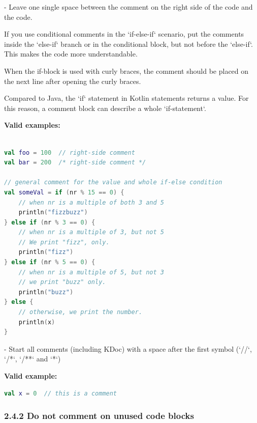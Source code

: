 - Leave one single space between the comment on the right side of the code and the code. 

If you use conditional comments in the `if-else-if` scenario, put the comments inside the `else-if` branch or in the conditional block, but not before the `else-if`. This makes the code more understandable.

When the if-block is used with curly braces, the comment should be placed on the next line after opening the curly braces.

Compared to Java, the `if` statement in Kotlin statements returns a value. For this reason, a comment block can describe a whole `if-statement`.



\textbf{Valid examples:}



\begin{lstlisting}[language=Kotlin]

val foo = 100  // right-side comment
val bar = 200  /* right-side comment */

// general comment for the value and whole if-else condition
val someVal = if (nr % 15 == 0) {
    // when nr is a multiple of both 3 and 5
    println("fizzbuzz")
} else if (nr % 3 == 0) {
    // when nr is a multiple of 3, but not 5
    // We print "fizz", only.
    println("fizz")
} else if (nr % 5 == 0) {
    // when nr is a multiple of 5, but not 3
    // we print "buzz" only.
    println("buzz")
} else {
    // otherwise, we print the number.
    println(x)
}
\end{lstlisting}


- Start all comments (including KDoc) with a space after the first symbol (`//`, `/*`, `/**` and `*`)



\textbf{Valid example:}



\begin{lstlisting}[language=Kotlin]
val x = 0  // this is a comment
\end{lstlisting}


\subsubsection*{\textbf{2.4.2 Do not comment on unused code blocks}}
\leavevmode\newline

\label{sec:2.4.2}



